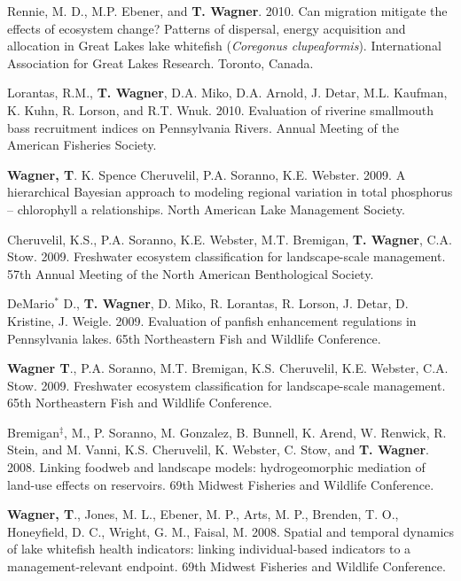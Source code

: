 \documentclass[10pt]{article}
\begin{document}
\begin{flushleft}
\begin{etaremune}
\item Rennie, M. D., M.P. Ebener, and {\bf T. Wagner}. 2010. Can migration mitigate the effects of ecosystem change? Patterns of dispersal, energy acquisition and allocation in Great Lakes lake whitefish (\emph{Coregonus clupeaformis}). International Association for Great Lakes Research. Toronto, Canada. 

\item Lorantas, R.M., {\bf T. Wagner}, D.A. Miko, D.A. Arnold, J. Detar, M.L. Kaufman, K. Kuhn, R. Lorson, and R.T. Wnuk. 2010. Evaluation of riverine smallmouth bass recruitment indices on Pennsylvania Rivers. Annual Meeting of the American Fisheries Society. 


\item {\bf Wagner, T}. K. Spence Cheruvelil, P.A. Soranno, K.E. Webster. 2009. A hierarchical Bayesian approach to modeling regional variation in total phosphorus – chlorophyll a relationships. North American Lake Management Society.

\item Cheruvelil, K.S., P.A. Soranno, K.E. Webster, M.T. Bremigan, {\bf T. Wagner}, C.A. Stow. 2009. Freshwater ecosystem classification for landscape-scale management. 57th Annual Meeting of the North American Benthological Society. 

\item DeMario$^*$ D., {\bf T. Wagner}, D. Miko, R. Lorantas, R. Lorson, J. Detar, D. Kristine, J. Weigle. 2009. Evaluation of panfish enhancement regulations in Pennsylvania lakes. 65th Northeastern Fish and Wildlife Conference.

\item {\bf Wagner T}., P.A. Soranno, M.T. Bremigan, K.S. Cheruvelil, K.E. Webster, C.A. Stow. 2009. Freshwater ecosystem classification for landscape-scale management. 65th Northeastern Fish and Wildlife Conference.


\item Bremigan$^\ddagger$, M., P. Soranno, M. Gonzalez,  B. Bunnell, K. Arend, W. Renwick, R. Stein, and M. Vanni, K.S. Cheruvelil, K. Webster, C. Stow, and {\bf T. Wagner}. 2008. Linking foodweb and landscape models: hydrogeomorphic mediation of land-use effects on reservoirs. 69th Midwest Fisheries and Wildlife Conference.

\item {\bf Wagner, T}., Jones, M. L., Ebener, M. P., Arts, M. P., Brenden, T. O., Honeyfield, D. C., Wright, G. M., Faisal, M. 2008. Spatial and temporal dynamics of lake whitefish health indicators: linking individual-based indicators to a management-relevant endpoint. 69th Midwest Fisheries and Wildlife Conference.


\end{etaremune}
\end{flushleft}
\end{document}

